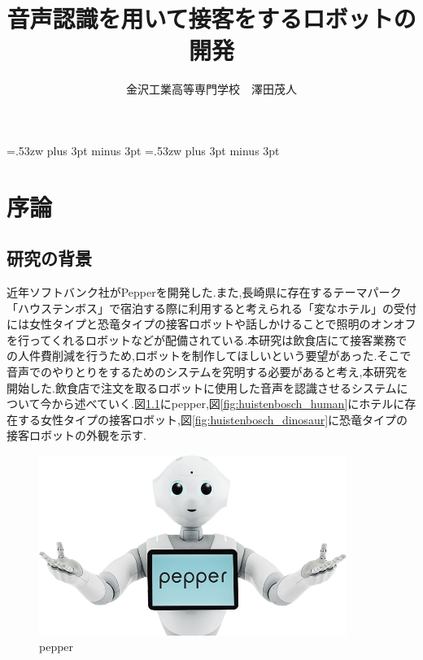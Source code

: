 \documentclass[12pt,oneside]{sotsuken_paper}
\begin{document}
\title{音声認識を用いて接客をするロボットの開発}

\author{金沢工業高等専門学校　澤田茂人}

\setlength{\baselineskip}{9truemm}

\kanJiskip=.53zw plus 3pt minus 3pt
\xkanJiskip=.53zw plus 3pt minus 3pt

\tableofcontents


\chapter{序論}
\section{研究の背景}
近年ソフトバンク社がPepperを開発した.また,長崎県に存在するテーマパーク「ハウステンボス」で宿泊する際に利用すると考えられる「変なホテル」の受付には女性タイプと恐竜タイプの接客ロボットや話しかけることで照明のオンオフを行ってくれるロボットなどが配備されている.本研究は飲食店にて接客業務での人件費削減を行うため,ロボットを制作してほしいという要望があった.そこで音声でのやりとりをするためのシステムを究明する必要があると考え,本研究を開始した.飲食店で注文を取るロボットに使用した音声を認識させるシステムについて今から述べていく.図\ref{fig:hospitality-robot}にpepper,図\ref{fig:huistenbosch_human}にホテルに存在する女性タイプの接客ロボット,図\ref{fig:huistenbosch_dinosaur}に恐竜タイプの接客ロボットの外観を示す.


\begin{figure}[htbp]
\begin{center}
\includegraphics[width=100mm]{img/pepper.png}
\caption{pepper}
\label{fig:hospitality-robot}
\end{center}
\end{figure}
\end{document}
